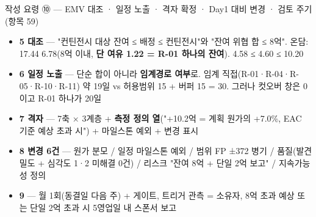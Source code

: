 \begin{frame}{작성 요령 ⑩ — EMV 대조 · 일정 노출 · 격자 확정 · Day1 대비 변경 · 검토 주기 (항목 5\til{}9)}
\begin{itemize}
\item \textbf{5 대조} — "컨틴전시 대상 잔여 ≤ 배정 ≤ 컨틴전시"와 "잔여 위협 합 ≤ 8억". 온담: 17.44 \ra{} 6.78(8억 이내, \textbf{단 여유 1.22 = R-01 하나의 잔여}). 4.58 ≤ 4.60 ≤ 10.20
\item \textbf{6 일정 노출} — 단순 합이 아니라 \textbf{임계경로 여부}로. 임계 직접(R-01·R-04·R-05·R-10·R-11) 약 19일 vs 허용범위 15 + 버퍼 15 = 30. 그러나 컷오버 창은 0이고 R-01 하나가 20일
\item \textbf{7 격자} — 7축 × 3계층 + \textbf{측정 정의 열}("+10.2억 = 계획 원가의 +7.0\%, EAC 기준 예상 초과 시") + 마일스톤 예외 + 변경 표시
\item \textbf{8 변경 6건} — 원가 분모 / 일정 마일스톤 예외 / 범위 FP ±372 병기 / 품질(발견 밀도 + 심각도 1·2 미해결 0건) / 리스크 "잔여 8억 + 단일 2억 보고" / 지속가능성 정의
\item \textbf{9} — 월 1회(동결일 다음 주) + 게이트, 트리거 관측 = 소유자, 8억 초과 예상 또는 단일 2억 초과 시 5영업일 내 스폰서 보고
\end{itemize}
\end{frame}

